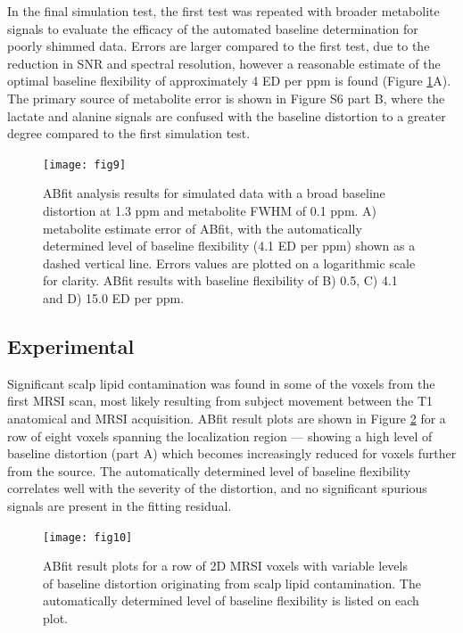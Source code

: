 \documentclass[num-refs]{wiley-article}
\begin{document}
In the final simulation test, the first test was repeated with broader metabolite signals to evaluate the efficacy of the automated baseline determination for poorly shimmed data. Errors are larger compared to the first test, due to the reduction in SNR and spectral resolution, however a reasonable estimate of the optimal baseline flexibility of approximately 4 ED per ppm is found (Figure \ref{broad_bl_bad_shim}A). The primary source of metabolite error is shown in Figure S6 part B, where the lactate and alanine signals are confused with the baseline distortion to a greater degree compared to the first simulation test.

\begin{figure}
  \begin{center}
    \texttt{[image: fig9]}
    \caption{ABfit analysis results for simulated data with a broad baseline distortion at 1.3 ppm and metabolite FWHM of 0.1 ppm. A) metabolite estimate error of ABfit, with the automatically determined level of baseline flexibility (4.1 ED per ppm) shown as a dashed vertical line. Errors values are plotted on a logarithmic scale for clarity. ABfit results with baseline flexibility of B) 0.5, C) 4.1 and D) 15.0 ED per ppm.}
    \label{broad_bl_bad_shim}
  \end{center}
\end{figure}

\subsection{Experimental}
Significant scalp lipid contamination was found in some of the voxels from the first MRSI scan, most likely resulting from subject movement between the T1 anatomical and MRSI acquisition. ABfit result plots are shown in Figure \ref{mrsi_eg_baselines} for a row of eight voxels spanning the localization region --- showing a high level of baseline distortion (part A) which becomes increasingly reduced for voxels further from the source. The automatically determined level of baseline flexibility correlates well with the severity of the distortion, and no significant spurious signals are present in the fitting residual.

\begin{figure}
  \begin{center}
    \texttt{[image: fig10]}
    \caption{ABfit result plots for a row of 2D MRSI voxels with variable levels of baseline distortion originating from scalp lipid contamination. The automatically determined level of baseline flexibility is listed on each plot.}
    \label{mrsi_eg_baselines}
  \end{center}
\end{figure}
\end{document}
